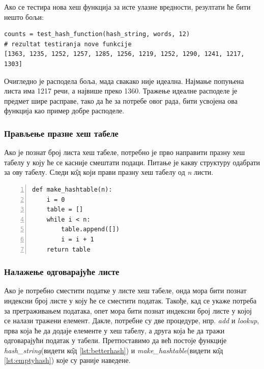 Ако се тестира нова хеш функција за исте улазне вредности, резултати ће бити нешто бољи:

\begin{lstlisting}[caption = Тестирање "боље" хеш функције,label={lst:betterhashtest}]
counts = test_hash_function(hash_string, words, 12)
# rezultat testiranja nove funkcije
[1363, 1235, 1252, 1257, 1285, 1256, 1219, 1252, 1290, 1241, 1217, 1303]
\end{lstlisting}

Очигледно је расподела боља, мада свакако није идеална. Најмање попуњена листа има 1217 речи, а највише преко 1360. Тражење идеалне расподеле је предмет шире расправе, тако да ће за потребе овог рада, бити усвојена ова функција као пример добре расподеле.


\subsubsection{Прављење празне хеш табеле}

Ако је познат број листа хеш табеле, потребно је прво направити празну хеш табелу у коју ће се касније смештати подаци. Питање је какву структуру одабрати за ову табелу. Следи к\^{о}д који прави празну хеш табелу од \emph{n} листи.

\begin{lstlisting}[caption=Празна хеш табела, label={lst:emptyhash}, numbers = left]
def make_hashtable(n):
    i = 0
    table = []
    while i < n:
        table.append([])
        i = i + 1
    return table
\end{lstlisting}

\subsubsection{Налажење одговарајуће листе}
Ако је потребно сместити податке у листе хеш табеле, онда мора бити познат индексни број листе у коју ће се сместити податак. Такође, кад се укаже потреба за  претраживањем података, опет мора бити познат индексни број листе у којој се налази тражени елемент. Дакле, потребне су две процедуре, нпр. \emph{add} и \emph{lookup}, прва која ће да додаје елементе у хеш табелу, а друга која ће да тражи одговарајући податак у табели. Претпоставимо да већ постоје функције \emph{hash\_string}(видети к\^{о}д \ref{lst:betterhash}) и \emph{make\_hashtable}(видети к\^{о}д \ref{lst:emptyhash}) које су раније наведене.

